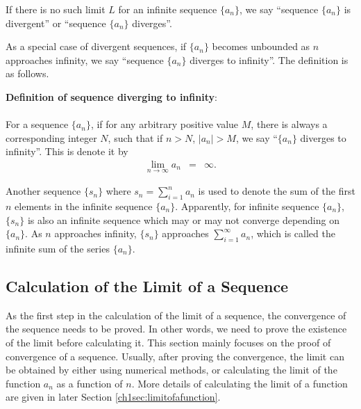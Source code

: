 If there is no such limit $L$ for an infinite sequence $\{a_n\}$, we say ``sequence $\{a_n\}$ is divergent'' or ``sequence $\{a_n\}$ diverges''.

As a special case of divergent sequences, if $\{a_n\}$ becomes unbounded as $n$ approaches infinity, we say ``sequence $\{a_n\}$ diverges to infinity''. The definition is as follows.
\begin{VF}
\textbf{Definition of sequence diverging to infinity}:
\\
\\
\noindent For a sequence $\{a_n\}$, if for any arbitrary positive value $M$, there is always a corresponding integer $N$, such that if $n>N$, $|a_n|>M$, we say ``$\{a_n\}$ diverges to infinity''. This is denote it by
\begin{eqnarray}
  \lim_{n\rightarrow \infty}a_n &=& \infty. \nonumber
\end{eqnarray}
\end{VF}

Another sequence $\{s_n\}$ where $s_n=\sum_{i=1}^{n}a_n$ is used to denote the sum of the first $n$ elements in the infinite sequence $\{a_n\}$. Apparently, for infinite sequence $\{a_n\}$, $\{s_n\}$ is also an infinite sequence which may or may not converge depending on $\{a_n\}$. As $n$ approaches infinity, $\{s_n\}$ approaches $\sum_{i=1}^{\infty} a_n$, which is called the infinite sum of the series $\{a_n\}$.

\subsection{Calculation of the Limit of a Sequence} \label{chisubsec:proofofsequenceconvergence}

As the first step in the calculation of the limit of a sequence, the convergence of the sequence needs to be proved. In other words, we need to prove the existence of the limit before calculating it. This section mainly focuses on the proof of convergence of a sequence. Usually, after proving the convergence, the limit can be obtained by either using numerical methods, or calculating the limit of the function $a_n$ as a function of $n$. More details of calculating the limit of a function are given in later Section \ref{ch1sec:limitofafunction}.


